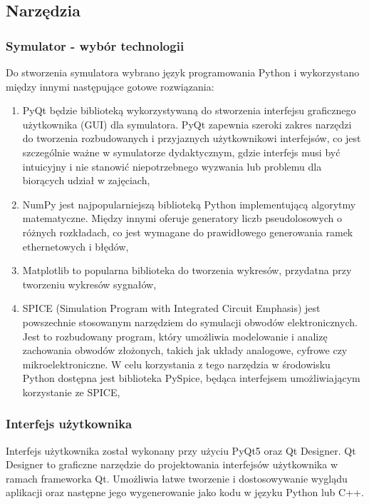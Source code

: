 \subsection{Narzędzia}

\subsubsection{Symulator - wybór technologii}
Do stworzenia symulatora wybrano język programowania Python i wykorzystano między innymi następujące gotowe rozwiązania:

\begin{enumerate}
    \item PyQt będzie biblioteką wykorzystywaną do stworzenia interfejsu graficznego użytkownika (GUI) dla symulatora. PyQt zapewnia szeroki zakres narzędzi do tworzenia rozbudowanych i przyjaznych użytkownikowi interfejsów, co jest szczególnie ważne w symulatorze dydaktycznym, gdzie interfejs musi być intuicyjny i nie stanowić niepotrzebnego wyzwania lub problemu dla biorących udział w zajęciach,
    \item NumPy jest najpopularniejszą biblioteką Python implementującą algorytmy matematyczne. Między innymi oferuje generatory liczb pseudolosowych o różnych rozkładach, co jest wymagane do prawidłowego generowania ramek ethernetowych i błędów,
    \item  Matplotlib to popularna biblioteka do tworzenia wykresów, przydatna przy tworzeniu wykresów sygnałów,
    \item SPICE (Simulation Program with Integrated Circuit Emphasis) jest powszechnie stosowanym narzędziem do symulacji obwodów elektronicznych. Jest to rozbudowany program, który umożliwia modelowanie i analizę zachowania obwodów złożonych, takich jak układy analogowe, cyfrowe czy mikroelektroniczne. W celu korzystania z tego narzędzia w środowisku Python dostępna jest biblioteka PySpice, będąca interfejsem umożliwiającym korzystanie ze SPICE,
\end{enumerate}

\subsubsection{Interfejs użytkownika}
Interfejs użytkownika został wykonany przy użyciu PyQt5 oraz Qt Designer. Qt Designer to graficzne narzędzie do projektowania interfejsów użytkownika w ramach frameworka Qt. Umożliwia łatwe tworzenie i dostosowywanie wyglądu aplikacji oraz następne jego wygenerowanie jako kodu w języku Python lub C++.

